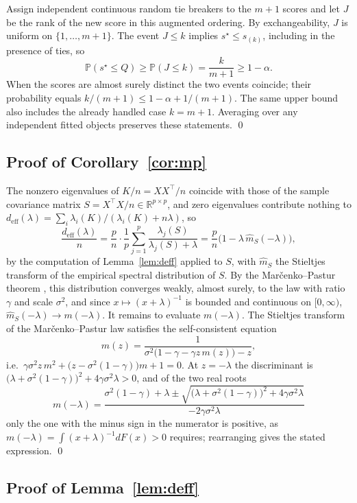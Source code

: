Assign independent continuous random tie breakers to the $m+1$ scores and
let $J$ be the rank of the new score in this augmented ordering. By
exchangeability, $J$ is uniform on $\{1,\ldots,m+1\}$. The event $J\le k$
implies $s^\star\le s_{(k)}$, including in the presence of ties, so
\[
\mathbb P(s^\star\le Q)\ge\mathbb P(J\le k)
=\frac{k}{m+1}\ge1-\alpha.
\]
When the scores are almost surely distinct the two events coincide; their
probability equals $k/(m+1)\le1-\alpha+1/(m+1)$. The same upper bound
also includes the already handled case $k=m+1$. Averaging over any
independent fitted objects preserves these statements. \qed

\subsection{Proof of Corollary~\ref{cor:mp}}
\label{proof:cor:mp}

The nonzero eigenvalues of $K/n=XX^\top\!/n$ coincide with those of the
sample covariance matrix $S=X^\top X/n\in\mathbb R^{p\times p}$, and zero
eigenvalues contribute nothing to
$d_{\mathrm{eff}}(\lambda)=\sum_i\lambda_i(K)/(\lambda_i(K)+n\lambda)$, so
\[
\frac{d_{\mathrm{eff}}(\lambda)}{n}
=\frac{p}{n}\cdot\frac1p\sum_{j=1}^{p}\frac{\lambda_j(S)}{\lambda_j(S)+\lambda}
=\frac{p}{n}\Big(1-\lambda\,\widehat m_S(-\lambda)\Big),
\]
by the computation of Lemma~\ref{lem:deff} applied to $S$, with
$\widehat m_S$ the Stieltjes transform of the empirical spectral distribution
of $S$. By the Mar\v{c}enko--Pastur theorem
\citep{marchenko1967distribution}, this distribution converges weakly, almost
surely, to the law with ratio $\gamma$ and scale $\sigma^2$, and since
$x\mapsto(x+\lambda)^{-1}$ is bounded and continuous on $[0,\infty)$,
$\widehat m_S(-\lambda)\to m(-\lambda)$. It remains to evaluate
$m(-\lambda)$. The Stieltjes transform of the Mar\v{c}enko--Pastur law
satisfies the self-consistent equation
\[
m(z)=\frac{1}{\sigma^2\big(1-\gamma-\gamma z\,m(z)\big)-z},
\]
i.e.\ $\gamma\sigma^2 z\,m^2+\big(z-\sigma^2(1-\gamma)\big)m+1=0$. At
$z=-\lambda$ the discriminant is
$\big(\lambda+\sigma^2(1-\gamma)\big)^2+4\gamma\sigma^2\lambda>0$, and of the
two real roots
\[
m(-\lambda)=\frac{\sigma^2(1-\gamma)+\lambda\pm
\sqrt{\big(\lambda+\sigma^2(1-\gamma)\big)^2+4\gamma\sigma^2\lambda}}
{-2\gamma\sigma^2\lambda}
\]
only the one with the minus sign in the numerator is positive, as
$m(-\lambda)=\int(x+\lambda)^{-1}dF(x)>0$ requires; rearranging gives the
stated expression. \qed

\subsection{Proof of Lemma~\ref{lem:deff}}
\label{proof:lem:deff}

